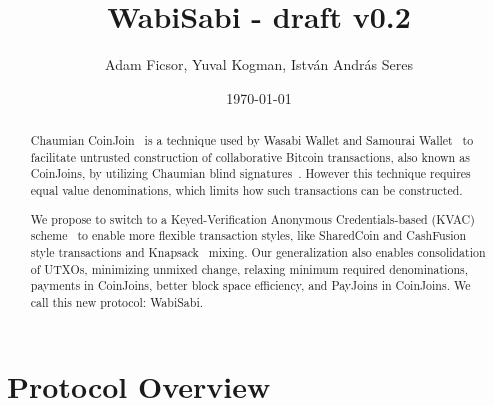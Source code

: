 \documentclass{article}
\title{WabiSabi - draft v0.2}
\author{Adam Ficsor, Yuval Kogman, István András Seres}
\date{\today}
\begin{document}
\maketitle

\begin{abstract}


Chaumian CoinJoin~\cite{mizrahi2013blind}\cite{maxwell2013coinjoin} is a technique used by Wasabi Wallet and Samourai Wallet~\cite{zerolink} to facilitate untrusted construction of collaborative Bitcoin transactions, also known as CoinJoins, by utilizing Chaumian blind signatures~\cite{chaum1983blind}. However this technique requires equal value denominations, which limits how such transactions can be constructed.

We propose to switch to a Keyed-Verification Anonymous Credentials-based (KVAC) scheme~\cite{chase2019signal} to enable more flexible transaction styles, like SharedCoin and CashFusion~\cite{cashfusion} style transactions and Knapsack~\cite{maurer2017anonymous} mixing. Our generalization also enables consolidation of UTXOs, minimizing unmixed change, relaxing minimum required denominations, payments in CoinJoins, better block space efficiency, and PayJoins in CoinJoins. We call this new protocol: WabiSabi.

\end{abstract}




\section{Protocol Overview}
\end{document}

